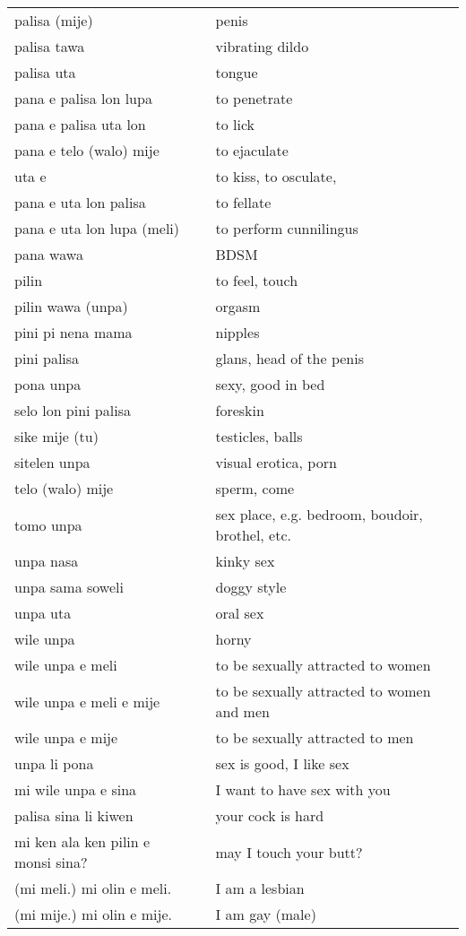 \begin{supertabular}{p{4,5cm}|ll}
palisa (mije) && penis \\
palisa tawa && vibrating dildo \\
palisa uta && tongue \\
pana e palisa lon lupa && to penetrate \\
pana e palisa uta lon && to lick \\
pana e telo (walo) mije && to ejaculate \\ 
uta e && to kiss, to osculate,  \\
pana e uta lon palisa && to fellate \\
pana e uta lon lupa (meli) && to perform cunnilingus \\
pana wawa && BDSM \\
pilin && to feel, touch \\
pilin wawa (unpa) && orgasm \\
pini pi nena mama && nipples \\
pini palisa && glans, head of the penis \\
pona unpa && sexy, good in bed \\
selo lon pini palisa && foreskin \\
sike mije (tu) && testicles, balls \\
sitelen unpa && visual erotica, porn \\
telo (walo) mije && sperm, come \\
tomo unpa && sex place, e.g. bedroom, boudoir, brothel, etc. \\ 
unpa nasa && kinky sex \\
unpa sama soweli && doggy style \\
unpa uta && oral sex \\
wile unpa && horny \\
wile unpa e meli && to be sexually attracted to women \\
wile unpa e meli e mije && to be sexually attracted to women and men \\ 
wile unpa e mije && to be sexually attracted to men \\
unpa li pona && sex is good, I like sex \\
mi wile unpa e sina && I want to have sex with you \\
palisa sina li kiwen && your cock is hard \\
mi ken ala ken pilin e monsi sina? && may I touch your butt? \\
(mi meli.) mi olin e meli. && I am a lesbian \\
(mi mije.) mi olin e mije. && I am gay (male) \\
\end{supertabular} \\
%
%
